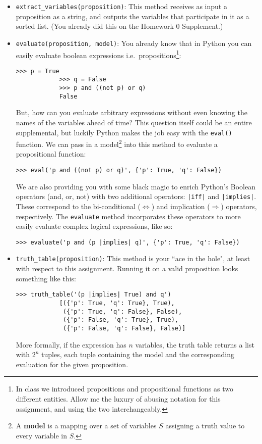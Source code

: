 \documentclass{article}
\begin{document}
    \begin{itemize}
        \item \lstinline+extract_variables(proposition)+: This method receives as input a proposition as a string, and outputs the variables that participate in it as a sorted list. (You already did this on the Homework 0 Supplement.)
        \item \lstinline+evaluate(proposition, model)+: You already know that in Python you can easily evaluate boolean expressions i.e.\ propositions\footnote{In class we introduced propositions and propositional functions as two different entities. Allow me the luxury of abusing notation for this assignment, and using the two interchangeably.}:
        \begin{lstlisting}[belowskip=-10pt]
            >>> p = True
            >>> q = False
            >>> p and ((not p) or q)
            False
        \end{lstlisting}
        But, how can you evaluate arbitrary expressions without even knowing the names of the variables ahead of time? This question itself could be an entire supplemental, but luckily Python makes the job easy with the \lstinline+eval()+ function. We can pass in a model\footnote{A \textbf{model} is a mapping over a set of variables $S$ assigning a truth value to every variable in $S$.} into this method to evaluate a propositional function:
        \begin{lstlisting}[belowskip=-10pt]
            >>> eval('p and ((not p) or q)', {'p': True, 'q': False})
        \end{lstlisting}
        We are also providing you with some black magic to enrich Python’s Boolean operators (and, or, not) with two additional operators: \lstinline+|iff|+ and \lstinline+|implies|+. These correspond to the bi-conditional ($\Leftrightarrow$) and implication ($\Rightarrow$) operators, respectively. The \lstinline+evaluate+ method incorporates these operators to more easily evaluate complex logical expressions, like so:
        \begin{lstlisting}[belowskip=-10pt]
            >>> evaluate('p and (p |implies| q)', {'p': True, 'q': False})
        \end{lstlisting}
        \item \lstinline+truth_table(proposition)+: This method is your ``ace in the hole", at least with respect to this assignment. Running it on a valid proposition looks something like this:
        \begin{lstlisting}[belowskip=-10pt]
            >>> truth_table('(p |implies| True) and q')
            [({'p': True, 'q': True}, True), 
             ({'p': True, 'q': False}, False), 
             ({'p': False, 'q': True}, True), 
             ({'p': False, 'q': False}, False)]
        \end{lstlisting}
        More formally, if the expression has $n$ variables, the truth table returns a list with $2^{n}$ tuples, each tuple containing the model and the corresponding evaluation for the given proposition.
    \end{itemize}
    
\end{document}
